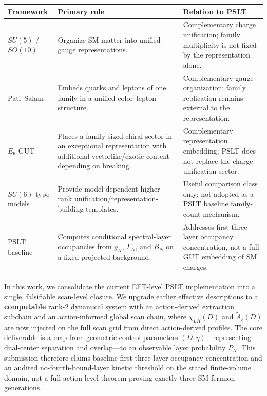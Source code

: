 \documentclass[aps,prd,onecolumn,notitlepage,nofootinbib,superscriptaddress,11pt,floatfix]{revtex4-2}
\begin{document}
\begingroup
\small
\setlength{\tabcolsep}{4pt}
\renewcommand{\arraystretch}{1.08}
\begin{center}
\begin{tabular}{@{}l l l@{}}
\toprule
\parbox[t]{0.18\textwidth}{\raggedright Framework} & \parbox[t]{0.36\textwidth}{\raggedright Primary role} & \parbox[t]{0.36\textwidth}{\raggedright Relation to PSLT} \\
\midrule
\parbox[t]{0.18\textwidth}{\raggedright \(SU(5)\) / \(SO(10)\)} & \parbox[t]{0.36\textwidth}{\raggedright Organize SM matter into unified gauge representations.} & \parbox[t]{0.36\textwidth}{\raggedright Complementary charge unification; family multiplicity is not fixed by the representation alone.} \\
\parbox[t]{0.18\textwidth}{\raggedright Pati--Salam} & \parbox[t]{0.36\textwidth}{\raggedright Embeds quarks and leptons of one family in a unified color--lepton structure.} & \parbox[t]{0.36\textwidth}{\raggedright Complementary gauge organization; family replication remains external to the representation.} \\
\parbox[t]{0.18\textwidth}{\raggedright \(E_6\) GUT} & \parbox[t]{0.36\textwidth}{\raggedright Places a family-sized chiral sector in an exceptional representation with additional vectorlike/exotic content depending on breaking.} & \parbox[t]{0.36\textwidth}{\raggedright Complementary representation embedding; PSLT does not replace the charge-unification sector.} \\
\parbox[t]{0.18\textwidth}{\raggedright \(SU(6)\)-type models} & \parbox[t]{0.36\textwidth}{\raggedright Provide model-dependent higher-rank unification/representation-building templates.} & \parbox[t]{0.36\textwidth}{\raggedright Useful comparison class only; not adopted as a PSLT baseline family-count mechanism.} \\
\parbox[t]{0.18\textwidth}{\raggedright PSLT baseline} & \parbox[t]{0.36\textwidth}{\raggedright Computes conditional spectral-layer occupancies from \(g_N\), \(\Gamma_N\), and \(B_N\) on a fixed projected background.} & \parbox[t]{0.36\textwidth}{\raggedright Addresses first-three-layer occupancy concentration, not a full GUT embedding of SM charges.} \\
\bottomrule
\end{tabular}
\end{center}
\endgroup

In this work, we consolidate the current EFT-level PSLT implementation into a single, falsifiable scan-level closure. We upgrade earlier effective descriptions to a \textbf{computable} rank-2 dynamical system with an action-derived extraction subchain and an action-informed global scan chain, where $\chi_{LR}(D)$ and $\tilde A_\ell(D)$ are now injected on the full scan grid from direct action-derived profiles. The core deliverable is a map from geometric control parameters $(D, \eta)$---representing dual-center separation and overlap---to an observable layer probability $P_N$. This submission therefore claims baseline first-three-layer occupancy concentration and an audited no-fourth-bound-layer kinetic threshold on the stated finite-volume domain, not a full action-level theorem proving exactly three SM fermion generations.
\end{document}
